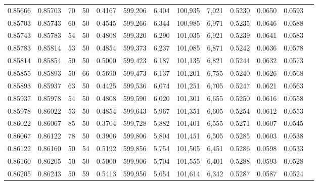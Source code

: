 \begin{tabular}{rrrrrrrrrrrrr}
0.85666 & 0.85703 &    70 &  50 &                                     0.4167 & 599,206 &   6,404 & 100,935 &   7,021 & 0.5230 & 0.0650 & 0.0593 \\
0.85703 & 0.85743 &    60 &  50 &                                     0.4545 & 599,266 &   6,344 & 100,985 &   6,971 & 0.5235 & 0.0646 & 0.0588 \\
0.85743 & 0.85783 &    54 &  50 &                                     0.4808 & 599,320 &   6,290 & 101,035 &   6,921 & 0.5239 & 0.0641 & 0.0583 \\
0.85783 & 0.85814 &    53 &  50 &                                     0.4854 & 599,373 &   6,237 & 101,085 &   6,871 & 0.5242 & 0.0636 & 0.0578 \\
0.85814 & 0.85854 &    50 &  50 &                                     0.5000 & 599,423 &   6,187 & 101,135 &   6,821 & 0.5244 & 0.0632 & 0.0573 \\
0.85855 & 0.85893 &    50 &  66 &                                     0.5690 & 599,473 &   6,137 & 101,201 &   6,755 & 0.5240 & 0.0626 & 0.0568 \\
0.85893 & 0.85937 &    63 &  50 &                                     0.4425 & 599,536 &   6,074 & 101,251 &   6,705 & 0.5247 & 0.0621 & 0.0563 \\
0.85937 & 0.85978 &    54 &  50 &                                     0.4808 & 599,590 &   6,020 & 101,301 &   6,655 & 0.5250 & 0.0616 & 0.0558 \\
0.85978 & 0.86022 &    53 &  50 &                                     0.4854 & 599,643 &   5,967 & 101,351 &   6,605 & 0.5254 & 0.0612 & 0.0553 \\
0.86022 & 0.86067 &    85 &  50 &                                     0.3704 & 599,728 &   5,882 & 101,401 &   6,555 & 0.5271 & 0.0607 & 0.0545 \\
0.86067 & 0.86122 &    78 &  50 &                                     0.3906 & 599,806 &   5,804 & 101,451 &   6,505 & 0.5285 & 0.0603 & 0.0538 \\
0.86122 & 0.86160 &    50 &  54 &                                     0.5192 & 599,856 &   5,754 & 101,505 &   6,451 & 0.5286 & 0.0598 & 0.0533 \\
0.86160 & 0.86205 &    50 &  50 &                                     0.5000 & 599,906 &   5,704 & 101,555 &   6,401 & 0.5288 & 0.0593 & 0.0528 \\
0.86205 & 0.86243 &    50 &  59 &                                     0.5413 & 599,956 &   5,654 & 101,614 &   6,342 & 0.5287 & 0.0587 & 0.0524 \\

\end{tabular}
